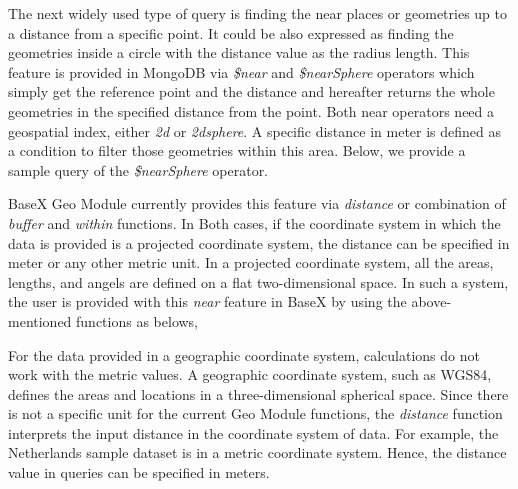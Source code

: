 \documentclass[a4paper,12pt]{article}
\begin{document}
The next widely used type of query is finding the near places or geometries up to a distance from a specific point. It could be also expressed as finding the geometries inside a circle with the distance value as the radius length. This feature is provided in MongoDB via \textit{\$near} and \textit{\$nearSphere} operators which simply get the reference point and the distance and hereafter returns the whole geometries in the specified distance from the point. Both near operators need a geospatial index, either \textit{2d} or \textit{2dsphere}. A specific distance in meter is defined as a condition to filter those geometries within this area. Below, we provide a sample query of the \textit{\$nearSphere} operator.  
\vspace{10px}
\vspace{10px}
BaseX Geo Module currently provides this feature via \textit{distance} or combination of \textit{buffer} and \textit{within} functions. In Both cases, if the coordinate system in which the data is provided is a projected coordinate system, the distance can be specified in meter or any other metric unit. In a projected coordinate system, all the areas, lengths, and angels are defined on a flat two-dimensional space. In such a system, the user is provided with this \textit{near} feature in BaseX by using the above-mentioned functions as belows,
\vspace{10px}
\vspace{10px}


For the data provided in a geographic coordinate system, calculations do not work with the metric values. A geographic coordinate system, such as WGS84, defines the areas and locations in a three-dimensional spherical space. Since there is not a specific unit for the current Geo Module functions, the \textit{distance} function interprets the input distance in the coordinate system of data. For example, the Netherlands sample dataset is in a metric coordinate system. Hence, the distance value in queries can be specified in meters. %
\end{document}
